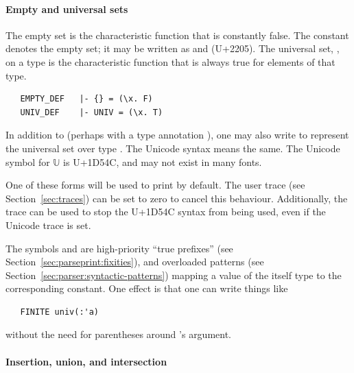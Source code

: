 {\paragraph{Empty and universal sets}
The empty set is the characteristic function that is constantly false. The constant  denotes the empty set; it may be written as \holtxt{\{\}} and \holtxt{$\emptyset$} (U+2205).
The universal set, , on a type is the characteristic function that is always true for elements of that type.
\begin{hol}
\begin{verbatim}
   EMPTY_DEF   |- {} = (\x. F)
   UNIV_DEF    |- UNIV = (\x. T)
\end{verbatim}
\end{hol}
In addition to  (perhaps with a type annotation ), one may also write  to represent the universal set over type .
The Unicode syntax  means the same.
The Unicode symbol for $\mathbb{U}$ is U+1D54C, and may not exist in many fonts.

One of these forms will be used to print  by default.
The user trace (see Section~\ref{sec:traces})  can be set to zero to cancel this behaviour.
Additionally, the trace  can be used to stop the U+1D54C syntax from being used, even if the Unicode trace is set.

The symbols  and  are high-priority ``true prefixes'' (see Section~\ref{sec:parseprint:fixities}), and overloaded patterns (see Section~\ref{sec:parser:syntactic-patterns}) mapping a value of the itself type to the corresponding  constant.
One effect is that one can write things like
\begin{hol}
\begin{verbatim}
   FINITE univ(:'a)
\end{verbatim}
\end{hol}
without the need for parentheses around 's argument.

\paragraph{Insertion, union, and intersection}

}
